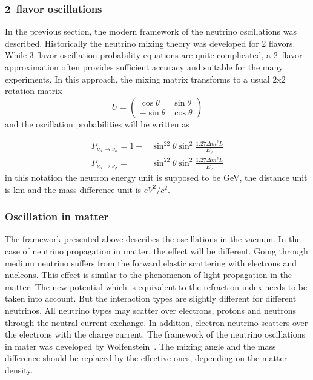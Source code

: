\documentclass[../main.tex]{subfiles}
\begin{document}
\subsubsection{2--flavor oscillations}
In the previous section, the modern framework of the neutrino oscillations was described. Historically the neutrino mixing theory was developed for 2 flavors. While 3-flavor oscillation probability equations are quite complicated, a 2--flavor approximation often provides sufficient accuracy and suitable for the many experiments. In this approach, the mixing matrix transforms to a usual 2x2 rotation matrix
\begin{equation}
U=
\begin{pmatrix}
\cos\theta    & \sin\theta     \\
-\sin\theta   & \cos\theta
\end{pmatrix}
\end{equation}
and the oscillation probabilities will be written as

\begin{align}
P_{\nu_\alpha\to\nu_\alpha}=1-&\sin^22\theta\sin^2\frac{1.27\Delta m^2L}{E_\nu} \\
P_{\nu_\alpha\to\nu_\beta}=&\sin^22\theta\sin^2\frac{1.27\Delta m^2L}{E_\nu}
\end{align}
in this notation the neutron energy unit is supposed to be GeV, the distance unit is km and the mass difference unit is $eV^2/c^2$.

\subsubsection{Oscillation in matter}
\label{sc:intro:mat}
The framework presented above describes the oscillations in the vacuum. In the case of neutrino propagation in matter, the effect will be different. Going through medium neutrino suffers from the forward elastic scattering with electrons and nucleons. This effect is similar to the phenomenon of light propagation in the matter. The new potential which is equivalent to the refraction index needs to be taken into account. But the interaction types are slightly different for different neutrinos. All neutrino types may scatter over electrons, protons and neutrons through the neutral current exchange. In addition, electron neutrino scatters over the electrons with the charge current. The framework of the neutrino oscillations in mater was developed by Wolfenstein~\cite{Wolfenstein1978}. The mixing angle and the mass difference should be replaced by the effective ones, depending on the matter density. 
\end{document}
